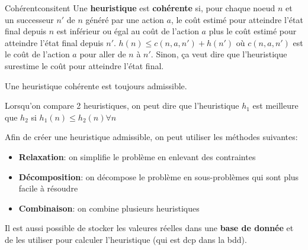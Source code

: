 \begin{definition}{Cohérent}{consitent}
    Une \textbf{heuristique} est \textbf{cohérente} si, pour chaque noeud $n$ et un successeur $n'$ de $n$ généré par une action $a$,
    le coût estimé pour atteindre l'état final depuis $n$ est inférieur ou égal au coût de l'action $a$ plus le coût estimé pour atteindre l'état final depuis $n'$. 
    \begin{math}
        h(n) \leq c(n, a, n') + h(n') 
    \end{math} 
    où $c(n, a, n')$ est le coût de l'action $a$ pour aller de $n$ à $n'$. 
    Sinon, ça veut dire que l'heuristique surestime le coût pour atteindre l'état final.
\end{definition}

\begin{remark}\leavevmode
    Une heuristique cohérente est toujours admissible. 
\end{remark}

\begin{note}
    Lorsqu'on compare 2 heuristiques, on peut dire que l'heuristique $h_1$ est meilleure que $h_2$ si 
    \begin{math}
        h_1(n) \leq h_2(n) \forall n 
    \end{math}
\end{note}

Afin de créer une heuristique admissible, on peut utiliser les méthodes suivantes: 
\begin{itemize}
    \item \textbf{Relaxation}: on simplifie le problème en enlevant des contraintes
    \item \textbf{Décomposition}: on décompose le problème en sous-problèmes qui sont plus facile à résoudre
    \item \textbf{Combinaison}: on combine plusieurs heuristiques 
\end{itemize}

Il est aussi possible de stocker les valeures réelles dans une \textbf{base de donnée} 
et de les utiliser pour calculer l'heuristique (qui est dcp dans la bdd).

